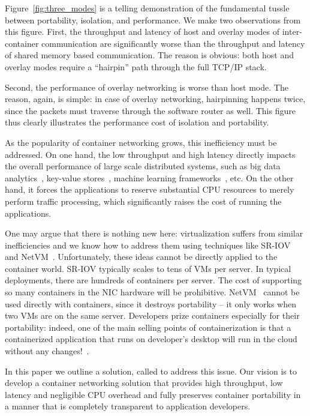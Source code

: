 Figure~\ref{fig:three_modes} is a telling demonstration of the fundamental
tussle between portability, isolation, and performance. We make two observations
from this figure. First, the throughput and latency of host and overlay modes of
inter-container communication are significantly worse than the throughput and
latency of shared memory based communication.  The reason is obvious: both host
and overlay modes require a ``hairpin'' path through the full TCP/IP stack. 

Second, the performance of overlay networking is worse than host mode. The
reason, again, is simple: in case of overlay networking, hairpinning happens
twice, since the packets must traverse through the software router as well. This
figure thus clearly illustrates the performance cost of isolation and
portability.

As the popularity of container networking grows, this inefficiency must be
addressed. On one hand, the low throughput and high latency directly impacts the
overall performance of large scale distributed systems, such as big data
analytics~\cite{varys,orchestra,reining,chowdhury}, key-value
stores~\cite{farm}, machine learning frameworks~\cite{li2014communication}, etc. On the other hand,
it forces the applications to reserve substantial CPU resources to merely
perform traffic processing, which significantly raises the cost of running the
applications.

One may argue that there is nothing new here: virtualization suffers from
similar inefficiencies and we know how to address them using techniques like
SR-IOV~\cite{sriov} and NetVM~\cite{netvm}. Unfortunately, these ideas cannot be
directly applied to the container world. SR-IOV typically scales to tens of VMs
per server. In typical deployments, there are hundreds of containers per server.
The cost of supporting so many containers in the NIC hardware will be
prohibitive. NetVM~\cite{netvm} cannot be used directly with containers, since
it destroys portability -- it only works when two VMs are on the same server.
Developers prize containers especially for their portability: indeed, one of the
main selling points of containerization is that a containerized application that
runs on developer's desktop will run in the cloud without any
changes!~\cite{docker-marketing-brag}. 

In this paper we outline a solution, called \sysname to address this issue. Our vision
is to develop a container networking solution that provides high throughput,
low latency and negligible CPU overhead and fully preserves container portability in
a manner that is completely transparent to application developers. 


